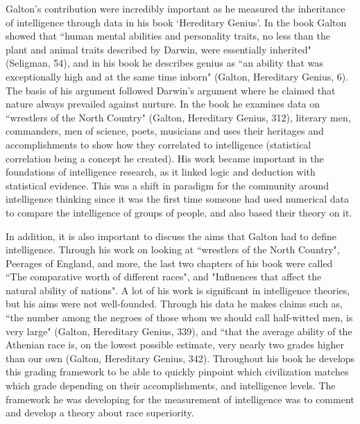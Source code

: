 \documentclass[12pt, oneside]{article}
\begin{document}
\par Galton's contribution were incredibly important as he measured the inheritance of intelligence through data in his book `Hereditary Genius'. In the book Galton showed that ``human mental abilities and personality traits, no less than the plant and animal traits described by Darwin, were essentially inherited" (Seligman, 54), and in his book he describes genius as ``an ability that was exceptionally high and at the same time inborn" (Galton, Hereditary Genius, 6). The basis of his argument followed Darwin's argument where he claimed that nature always prevailed against nurture. In the book he examines data on ``wrestlers of the North Country" (Galton, Hereditary Genius, 312), literary men, commanders, men of science, poets, musicians and uses their heritages and accomplishments to show how they correlated to intelligence (statistical correlation being a concept he created). His work became important in the foundations of intelligence research, as it linked logic and deduction with statistical evidence. This was a shift in paradigm for the community around intelligence thinking since it was the first time someone had used numerical data to compare the intelligence of groups of people, and also based their theory on it.

\par In addition, it is also important to discuss the aims that Galton had to define intelligence. Through his work on looking at ``wrestlers of the North Country", Peerages of England, and more, the last two chapters of his book were called ``The comparative worth of different races", and "Influences that affect the natural ability of nations". A lot of his work is significant in intelligence theories, but his aims were not well-founded. Through his data he makes claims such as, ``the number among the negroes of those whom we should call half-witted men, is very large" (Galton, Hereditary Genius, 339), and ``that the average ability of the Athenian race is, on the lowest possible estimate, very nearly two grades higher than our own (Galton, Hereditary Genius, 342). Throughout his book he develops this grading framework to be able to quickly pinpoint which civilization matches which grade depending on their accomplishments, and intelligence levels. The framework he was developing for the measurement of intelligence was to comment and develop a theory about race superiority.
\end{document}
